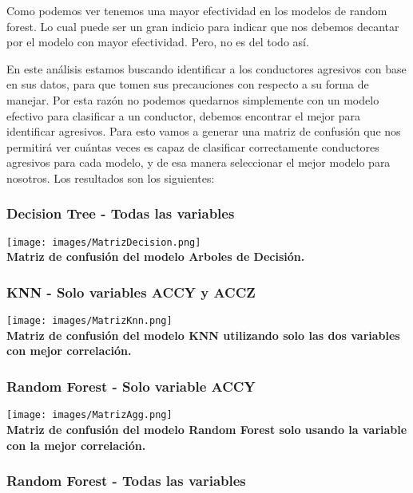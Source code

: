 \documentclass{article}
\begin{document}
Como podemos ver tenemos una mayor efectividad en los modelos de random forest. Lo cual puede ser un gran indicio para indicar que nos debemos decantar por el modelo con mayor efectividad. Pero, no es del todo así.


En este análisis estamos buscando identificar a los conductores agresivos con base en sus datos, para que tomen sus precauciones con respecto a su forma de manejar. Por esta razón no podemos quedarnos simplemente con un modelo efectivo para clasificar a un conductor, debemos encontrar el mejor para identificar agresivos. Para esto vamos a generar una matriz de confusión que nos permitirá ver cuántas veces es capaz de clasificar correctamente conductores agresivos para cada modelo, y de esa manera seleccionar el mejor modelo para nosotros. Los resultados son los siguientes:

    \subsubsection{Decision Tree - Todas las variables}

        \texttt{[image: images/MatrizDecision.png]} \\

        \textbf{Matriz de confusión del modelo Arboles de Decisión.} \\

    \subsubsection{KNN - Solo variables ACCY y ACCZ}

        \texttt{[image: images/MatrizKnn.png]} \\

        \textbf{Matriz de confusión del modelo KNN utilizando solo las dos variables con mejor correlación.} \\

    \subsubsection{Random Forest - Solo variable ACCY}

        \texttt{[image: images/MatrizAgg.png]} \\

        \textbf{Matriz de confusión del modelo Random Forest solo usando la variable con la mejor correlación.} \\

    \subsubsection{Random Forest - Todas las variables}
\end{document}
